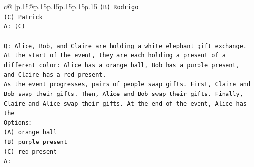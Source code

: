 \documentclass{article}
\begin{document}
{\begin{supertabular}{c@{$\;$}|p{.15\linewidth}@{}p{.15\linewidth}p{.15\linewidth}p{.15\linewidth}p{.15\linewidth}p{.15\linewidth}}
{{{\texttt{(B) Rodrigo} \\
\texttt{(C) Patrick} \\
\texttt{A: (C)} \\
\\ 
\texttt{Q: Alice, Bob, and Claire are holding a white elephant gift exchange. At the start of the event, they are each holding a present of a different color: Alice has a orange ball, Bob has a purple present, and Claire has a red present.} \\
\texttt{As the event progresses, pairs of people swap gifts. First, Claire and Bob swap their gifts. Then, Alice and Bob swap their gifts. Finally, Claire and Alice swap their gifts. At the end of the event, Alice has the} \\
\texttt{Options:} \\
\texttt{(A) orange ball} \\
\texttt{(B) purple present} \\
\texttt{(C) red present} \\
\texttt{A:} \\
            }
        }
    }
     \\ \\


\end{supertabular}}
\end{document}
